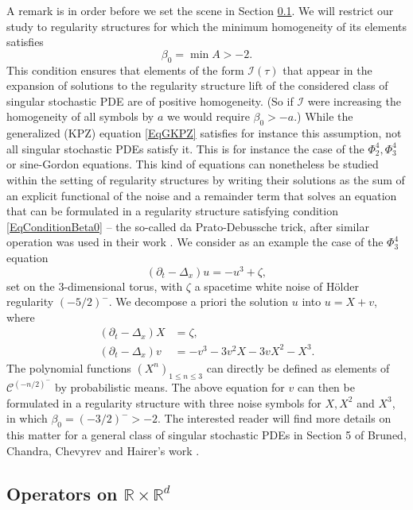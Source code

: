 \documentclass[10pt, reqno]{amsart}
\numberwithin{subsection}{section}
\numberwithin{subsubsection}{subsection}
\numberwithin{equation}{section} %
\theoremstyle{mystyle}
\theoremstyle{mystyle2}
\theoremstyle{mystyle3}
\newcommand\bbR{\mathbb{R}}
\newcommand{\mcC}{\mathcal{C}}
\newcommand{\mcI}{\mathcal{I}}
\begin{document}
A remark is in order before we set the scene in Section \ref{SubsectionOperators}. We will restrict our study to regularity structures for which the minimum homogeneity of its elements satisfies
\begin{equation} \label{EqConditionBeta0}
\beta_0 = \min A > -2.
\end{equation}
This condition ensures that elements of the form $\mcI(\tau)$ that appear in the expansion of solutions to the regularity structure lift of the considered class of singular stochastic PDE are of positive homogeneity. (So if $\mcI$ were increasing the homogeneity of all symbols by $a$ we would require $\beta_0>-a$.) While the generalized (KPZ) equation \eqref{EqGKPZ} satisfies for instance this assumption, not all singular stochastic PDEs satisfy it. This is for instance the case of the $\Phi^4_2, \Phi^4_3$ or sine-Gordon equations. This kind of equations can nonetheless be studied within the setting of regularity structures by writing their solutions as the sum of an explicit functional of the noise and a remainder term that solves an equation that can be formulated in a regularity structure satisfying condition \eqref{EqConditionBeta0} -- the so-called da Prato-Debussche trick, after similar operation was used in their work \cite{DPD}. We consider as an example the case of the $\Phi^4_3$ equation
$$
(\partial_t-\Delta_x)u = -u^3 + \zeta,
$$
set on the $3$-dimensional torus, with $\zeta$ a spacetime white noise of H\"older regularity $(-5/2)^-$. We decompose a priori the solution $u$ into $u=X+v$, where
\begin{align*}
(\partial_t-\Delta_x)X &= \zeta,   \\
(\partial_t-\Delta_x)v &= -v^3-3v^2X-3vX^2-X^3.
\end{align*}
The polynomial functions $(X^n)_{1\leq n\leq 3}$ can directly be defined as elements of $\mcC^{(-n/2)^-}$ by probabilistic means. The above equation for $v$ can then be formulated in a regularity structure with three noise symbols for $X,X^2$ and $X^3$, in which $\beta_0=(-3/2)^->-2$. The interested reader will find more details on this matter for a general class of singular stochastic PDEs in Section 5 of Bruned, Chandra, Chevyrev and Hairer's work \cite{BCCH18}.   



\vfill \pagebreak



\subsection{Operators on $\bbR\times\bbR^d$}
\label{SubsectionOperators}
\end{document}
